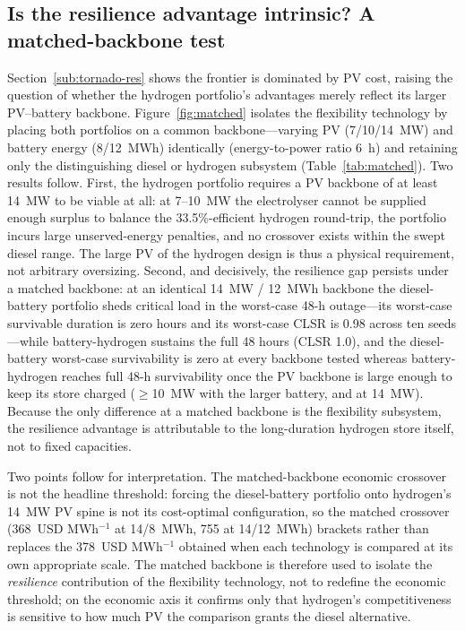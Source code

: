 \documentclass[preprint,12pt]{elsarticle}
\begin{document}
\subsection{Is the resilience advantage intrinsic? A matched-backbone test}
\label{sub:matched-res}
Section~\ref{sub:tornado-res} shows the frontier is dominated by PV cost, raising
the question of whether the hydrogen portfolio's advantages merely reflect its
larger PV--battery backbone. Figure~\ref{fig:matched} isolates the flexibility
technology by placing both portfolios on a common backbone---varying PV (7/10/14~MW)
and battery energy (8/12~MWh) identically (energy-to-power ratio 6~h) and retaining
only the distinguishing diesel or hydrogen subsystem (Table~\ref{tab:matched}). Two
results follow. First, the hydrogen portfolio requires a PV backbone of at least
14~MW to be viable at all: at 7--10~MW the electrolyser cannot be supplied enough
surplus to balance the 33.5\%-efficient hydrogen round-trip, the portfolio incurs
large unserved-energy penalties, and no crossover exists within the swept diesel
range. The large PV of the hydrogen design is thus a physical requirement, not
arbitrary oversizing. Second, and decisively, the resilience gap persists under a
matched backbone: at an identical 14~MW / 12~MWh backbone the diesel-battery
portfolio sheds critical load in the worst-case 48-h outage---its worst-case
survivable duration is zero hours and its worst-case CLSR is 0.98 across ten
seeds---while battery-hydrogen sustains the full 48 hours (CLSR 1.0), and the
diesel-battery worst-case survivability is zero at every backbone tested whereas
battery-hydrogen reaches full 48-h survivability once the PV backbone is large
enough to keep its store charged ($\ge$10~MW with the larger battery, and at
14~MW). Because the only difference at a matched
backbone is the flexibility subsystem, the resilience advantage is attributable to
the long-duration hydrogen store itself, not to fixed capacities.

Two points follow for interpretation. The matched-backbone economic crossover is
not the headline threshold: forcing the diesel-battery portfolio onto
hydrogen's 14~MW PV spine is not its cost-optimal configuration, so the matched
crossover (368~USD MWh$^{-1}$ at 14/8~MWh, 755 at 14/12~MWh) brackets rather than
replaces the 378~USD MWh$^{-1}$ obtained when each technology is compared at its own
appropriate scale. The matched backbone is therefore used to isolate the
\emph{resilience} contribution of the flexibility technology, not to redefine the
economic threshold; on the economic axis it confirms only that hydrogen's
competitiveness is sensitive to how much PV the comparison grants the diesel
alternative.
\end{document}
